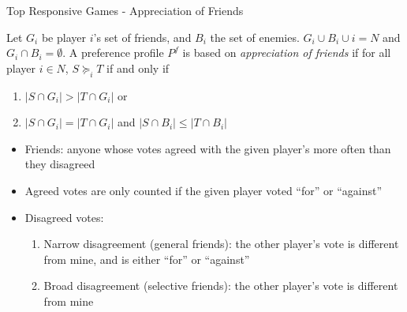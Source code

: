 \documentclass[xcolor=dvipsnames]{beamer}
\begin{document}
\begin{frame}{Top Responsive Games - Appreciation of Friends}

  Let $G_i$ be player $i$'s set of friends, and $B_i$ the set of enemies.
  $G_i \cup B_i \cup i = N$ and $G_i \cap B_i = \emptyset$.
  A preference profile $P^f$ is based on \textit{appreciation of friends} if for all player $i \in N$,
  $S \succeq_i T$ if and only if
  \begin{enumerate}
    \item $|S \cap G_i| > |T \cap G_i|$ or
    \item $|S \cap G_i| = |T \cap G_i|$ and $|S \cap B_i| \leq |T \cap B_i|$
  \end{enumerate}

  \begin{itemize}
      \item<only@1> Friends: anyone whose votes agreed with the given player's more often than they disagreed
      \item<only@1> Agreed votes are only counted if the given player voted ``for'' or ``against''
      \item<only@1> Disagreed votes:
      \begin{enumerate}
        \item Narrow disagreement (general friends): the other player's vote is different from mine, and is either ``for'' or ``against''
        \item Broad disagreement (selective friends): the other player's vote is different from mine
      \end{enumerate}
  \end{itemize}
\end{frame}
\end{document}
